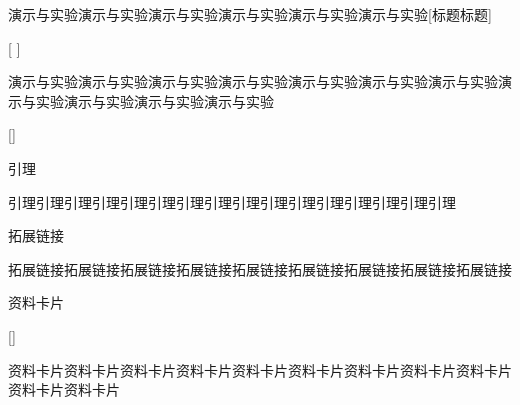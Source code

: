 \documentclass[color=green]{textbook-cn}%
\begin{document}
\begin{Project}
\begin{box2}{演示与实验演示与实验演示与实验演示与实验演示与实验演示与实验}[标题标题]
	\lipsum[2]
\end{box2}


\begin{box2}{ }[ ]
	\lipsum[2]
\end{box2}


\newpage
\begin{box3}{演示与实验演示与实验演示与实验演示与实验演示与实验演示与实验演示与实验演示与实验演示与实验演示与实验演示与实验}
	\lipsum[2]
\end{box3}


\begin{box3}{ }[]
	\lipsum[2][1-3]
\end{box3}





\begin{box4}{引理}
\lipsum[2]
\end{box4}

\begin{box4}{引理引理引理引理引理引理引理引理引理引理引理引理引理引理引理引理}
\lipsum[2]
\end{box4}



\begin{box5}{拓展链接}
\lipsum[2]
\end{box5}

\begin{box5}{拓展链接拓展链接拓展链接拓展链接拓展链接拓展链接拓展链接拓展链接拓展链接}
	\lipsum[2]
	\lipsum[2]
\end{box5}



\begin{box6}{资料卡片}
	\lipsum[2]
\end{box6}



\begin{box6}{ }[]
	\lipsum[2][1-3]
\end{box6}


\begin{box6}{资料卡片资料卡片资料卡片资料卡片资料卡片资料卡片资料卡片资料卡片资料卡片资料卡片资料卡片}
	\lipsum[2]
\end{box6}


\begin{Information}
	\lipsum[2]
	\lipsum[2]
\end{Information}





\end{Project}
\end{document}
